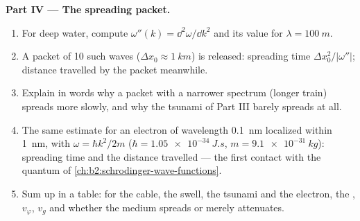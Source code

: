 \begin{problem}
\medskip
\noindent\textbf{Part IV --- The spreading packet.}
\begin{enumerate}[resume]
  \item For deep water, compute $\omega''(k) = \dd^2\omega/\dd k^2$ and its value
        for $\lambda = \qty{100}{m}$.
  \item A packet of \qty{10}{} such waves ($\Delta x_0 \approx \qty{1}{km}$) is
        released: spreading time $\Delta x_0^2/|\omega''|$; distance travelled
        by the packet meanwhile.
  \item Explain in words why a packet with a narrower spectrum
        (longer train) spreads more slowly, and why the tsunami of
        Part III barely spreads at all.
  \item The same estimate for an electron of wavelength \qty{0.1}{nm}
        localized within \qty{1}{nm}, with $\omega = \hbar k^2/2m$ ($\hbar =
        \qty{1.05e-34}{J.s}$, $m = \qty{9.1e-31}{kg}$): spreading time and
        the distance travelled --- the first contact with the quantum
         of \cref{ch:b2:schrodinger-wave-functions}.
  \item Sum up in a table: for the cable, the swell, the tsunami and
        the electron, the , $v_\varphi$, $v_g$ and
        whether the medium spreads or merely attenuates.
\end{enumerate}
\end{problem}

